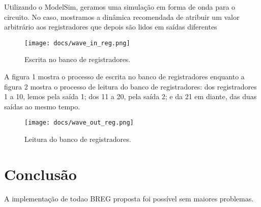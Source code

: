 \documentclass[12pt, a4paper, twoside]{article}
\begin{document}
Utilizando o ModelSim, geramos uma simulação em forma de onda para o circuito.
No caso, mostramos a dinâmica recomendada de atribuir um valor arbitrário aos
registradores que depois são lidos em saídas diferentes

\begin{figure}
	\centering
	\texttt{[image: docs/wave\_in\_reg.png]}
	\caption{Escrita no banco de registradores.}
\end{figure}

A figura 1 mostra o processo de escrita no banco de registradores enquanto a
figura 2 mostra o processo de leitura do banco de registradores: dos
registradores 1 a 10, lemos pela saída 1; dos 11 a 20, pela saída 2; e da 21
em diante, das duas saídas ao mesmo tempo.

\begin{figure}
	\centering
	\texttt{[image: docs/wave\_out\_reg.png]}
	\caption{Leitura do banco de registradores.}
\end{figure}

\section{Conclusão}

A implementação de todao BREG proposta foi possível sem maiores problemas.
\end{document}
